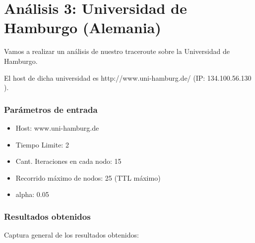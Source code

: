 \section{An\'alisis 3: Universidad de Hamburgo (Alemania)}
Vamos a realizar un an\'alisis de nuestro traceroute sobre la Universidad de Hamburgo.

El host de dicha universidad es http://www.uni-hamburg.de/ (IP: 134.100.56.130 ).\\	


\subsubsection{Par\'ametros de entrada}
\begin{itemize}
\item Host: www.uni-hamburg.de
\item Tiempo Limite: 2
\item Cant. Iteraciones en cada nodo: 15
\item Recorrido m\'aximo de nodos: 25 (TTL m\'aximo)
\item alpha: 0.05
\end{itemize}

\subsubsection{Resultados obtenidos}

Captura general de los resultados obtenidos: 
\\
\\

